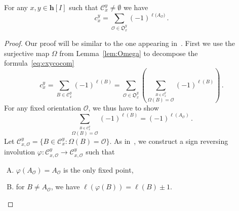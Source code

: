 \documentclass[ALCO,ThmDefs,Unicode,epreuves]{cedram}
\begin{document}
\begin{theorem} \label{thm:anticoco}
For any $x,y\in \mathbf{h}[I]$ such that $\mathcal{C}_{x}^{y}\ne\emptyset$ we have
 $$c_x^y=\sum_{\mathcal{O} \in \mathfrak{O}_x^y} (-1)^{\ell{(A_{\mathcal{O}}})} \,.$$
\end{theorem}

\begin{proof}
Our proof will be similar to the one appearing in~\cite{Bergeron-Ceballos}. First we use the surjective map $\Omega$ from Lemma~\ref{lem:Omega} to decompose the formula~\eqref{eq:cxycocom}
 $$c_x^y=\sum_{B\in \mathcal{C}_{x}^{y}} (-1)^{\ell(B)} = \sum_{\mathcal{O} \in \mathfrak{O}_x^y}\left(\sum_{\stackrel{B\in \mathcal{C}_{x}^{y}}%
 {\Omega(B)=\mathcal{O}}} (-1)^{\ell(B)}\right)\,.$$
For any fixed orientation $\mathcal{O}$, we thus have to show
 $$ \sum_{\stackrel{B\in \mathcal{C}_{x}^{y}} %
 {\Omega(B)=\mathcal{O}}} (-1)^{\ell(B)} = (-1)^{\ell(A_{\mathcal{O}})} \,.$$
 Let $\mathcal{C}_{x,\mathcal{O}}^{y}=\{B \in \mathcal{C}_{x}^{y}: \Omega(B)=\mathcal{O}\}$.
As in~\cite{Benedetti-Sagan,Bergeron-Ceballos}, we construct a sign reversing involution $\varphi\colon \mathcal{C}_{x,\mathcal{O}}^{y}\to \mathcal{C}_{x,\mathcal{O}}^{y}$ such that
\begin{enumerate}[(A)] 
\item\label{proof_theo3.16A}
 $\varphi(A_\mathcal{O})=A_{\mathcal{O}}$ is the only fixed point,
 
\item\label{proof_theo3.16B} for $B\ne A_{\mathcal{O}}$, we have $\ell(\varphi(B))=\ell(B)\pm 1$.
\end{enumerate} 
 

\end{proof}
\end{document}
